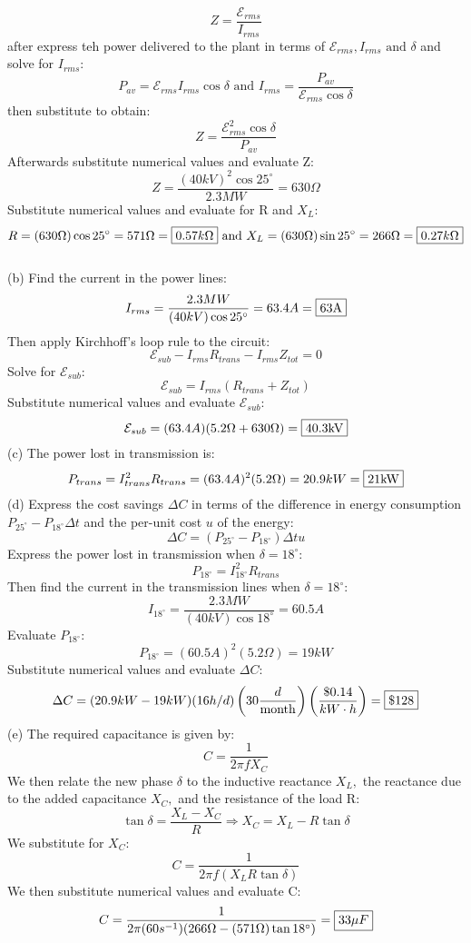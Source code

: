 \documentclass{report}
\begin{document}
$$Z = \frac{\mathcal{E}_{rms}}{I_{rms}}$$
after express teh power delivered to the plant in terms of $\mathcal{E}_{rms}, I_{rms} \text{ and } \delta$ and solve for $I_{rms}:$
$$P_{av} = \mathcal{E}_{rms}I_{rms}\cos \delta \text{ and } I_{rms} = \frac{P_{av}}{\mathcal{E}_{rms}\cos \delta}$$
then substitute to obtain:
$$Z = \frac{\mathcal{E}_{rms}^2 \cos\delta}{P_{av}}$$
Afterwards substitute numerical values and evaluate Z:
$$Z = \frac{(40 kV)^2 \cos 25^{\circ}}{2.3MW} = 630 \Omega$$
Substitute numerical values and evaluate for R and $X_L:$
$$R = (630 \Omega)\cos 25^{\circ} = 571\Omega = \fbox{$0.57k\Omega$} \text{ and } X_L = (630\Omega)\sin 25^{\circ} = 266\Omega = \fbox{$0.27k\Omega$}$$
\\
(b) Find the current in the power lines:
$$I_{rms} = \frac{2.3MW}{(40kV)\cos 25^{\circ}} = 63.4 A = \fbox{63A}$$
Then apply Kirchhoff's loop rule to the circuit:
$$\mathcal{E}_{sub} - I_{rms}R_{trans} - I_{rms}Z_{tot} = 0$$
Solve for $\mathcal{E}_{sub}:$
$$\mathcal{E}_{sub} = I_{rms}(R_{trans} + Z_{tot})$$
Substitute numerical values and evaluate $\mathcal{E}_{sub}:$
$$\mathcal{E}_{sub} = (63.4A)(5.2\Omega + 630\Omega) = \fbox{40.3kV}$$
(c) The power lost in transmission is:
$$P_{trans} = I_{trans}^2 R_{trans} = (63.4A)^2(5.2\Omega) = 20.9kW = \fbox{21kW}$$
(d) Express the cost savings $\Delta C$ in terms of the difference in energy consumption $P_{25^{\circ}} - P_{18^{\circ}}\Delta t$ and the per-unit cost $u$ of the energy:
$$\Delta C = (P_{25^{\circ}} - P_{18^{\circ}})\Delta tu$$
Express the power lost in transmission when $\delta = 18^{\circ}:$
$$P_{18^{\circ}} = I_{18^{\circ}}^2R_{trans}$$
Then find the current in the transmission lines when $\delta = 18^{\circ}:$
$$I_{18^{\circ}} = \frac{2.3MW}{(40kV)\cos 18^{\circ}} = 60.5A$$
Evaluate $P_{18^{\circ}}:$
$$P_{18^{\circ}} = (60.5A)^2(5.2\Omega) = 19 kW$$
Substitute numerical values and evaluate $\Delta C:$
$$\Delta C = (20.9kW - 19kW)(16 h/d)\left( 30 \frac{d}{\text{month}}\right) \left( \frac{\$0.14}{kW \cdot h}\right) = \fbox{\$128}$$
(e) The required capacitance is given by:
$$C = \frac{1}{2\pi fX_C}$$
We then relate the new phase $\delta$ to the inductive reactance $X_L,$ the reactance due to the added capacitance $X_C,$ and the resistance of the load R:
$$\tan \delta = \frac{X_L - X_C}{R} \Rightarrow X_C = X_L - R \tan \delta$$
We substitute for $X_C:$
$$C = \frac{1}{2\pi f(X_L R \tan \delta)}$$
We then substitute numerical values and evaluate C:
$$C = \frac{1}{2\pi(60s^{-1})(266\Omega - (571\Omega)\tan 18^{\circ})} = \fbox{$33\mu F$}$$
\end{document}
